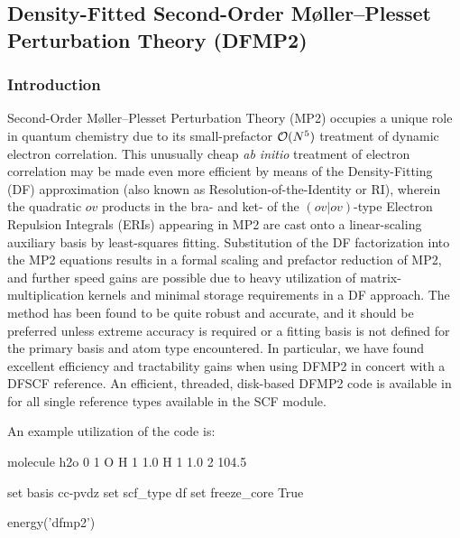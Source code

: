 \subsection{Density-Fitted Second-Order M\o{}ller--Plesset Perturbation Theory (DFMP2)} \label{dfmp2}
\renewcommand{\optionname}[2]{\texttt{\nameref{op-#2-#1}}}

\subsubsection{Introduction}

Second-Order M\o{}ller--Plesset Perturbation Theory (MP2) occupies a unique role
in quantum chemistry due to its small-prefactor ${\cal O}(N^5)$ treatment of
dynamic electron correlation. This unusually cheap
\textit{ab initio} treatment of electron correlation may be made even more
efficient by means of the Density-Fitting (DF) approximation (also known as
Resolution-of-the-Identity or RI), wherein the quadratic $ov$ products in the
bra- and ket- of the $(ov|ov)$-type Electron Repulsion Integrals (ERIs)
appearing in MP2 are cast onto a linear-scaling auxiliary basis by least-squares
fitting.  Substitution of the DF factorization into the MP2 equations results in
a formal scaling and prefactor reduction of MP2, and further speed gains are
possible due to heavy utilization of matrix-multiplication kernels and minimal
storage requirements in a DF approach. The method has been found to be quite
robust and accurate, and it should be preferred unless extreme accuracy is required
or a fitting basis is not defined for the primary basis and atom type
encountered. In particular, we have found excellent efficiency and tractability
gains when using DFMP2 in concert with a DFSCF reference.  An efficient,
threaded, disk-based DFMP2 code is available in \PSIfour for all single
reference types available in the SCF module.  

An example utilization of the code is:
\begin{Snippet}
molecule h2o {
0 1
O
H 1 1.0
H 1 1.0 2 104.5
}

set basis cc-pvdz
set scf_type df
set freeze_core True

energy('dfmp2')
\end{Snippet}

